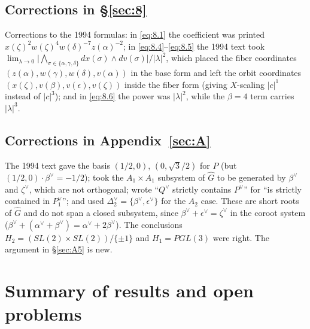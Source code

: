 \documentclass[12pt,letterpaper]{amsart}
\theoremstyle{plain}
\theoremstyle{definition}
\theoremstyle{remark}
\theoremstyle{definition}
\begin{document}
\subsection*{Corrections in \S\ref{sec:8}}

\begin{rem26}\label{rem:8.forms}
Corrections to the 1994 formulas: in \eqref{eq:8.1} the coefficient was printed
$x(\zeta)^2w(\zeta)^4w(\delta)^{-7}z(\alpha)^{-2}$; in \eqref{eq:8.4}--\eqref{eq:8.5}
the 1994 text took $\lim_{\lambda\to0}\bigl|\bigwedge_{\sigma\in\{\alpha,\gamma,\delta\}}dx(\sigma)\wedge dv(\sigma)\bigr|/|\lambda|^2$,
which placed the fiber coordinates $(z(\alpha),w(\gamma),w(\delta),v(\alpha))$
in the base form and left the orbit coordinates $(x(\zeta),v(\beta),v(\epsilon),v(\zeta))$
inside the fiber form (giving $X$-scaling $|c|^1$ instead of $|c|^3$); and in
\eqref{eq:8.6} the power was $|\lambda|^2$, while the $\beta=4$ term carries
$|\lambda|^3$.
\end{rem26}

\subsection*{Corrections in Appendix~\ref{sec:A}}

\begin{rem26}\label{rem:A5}
The 1994 text gave the basis $(1/2,0)$, $(0,\sqrt3/2)$ for $P$ (but
$(1/2,0)\cdot\beta^\vee=-1/2$); took the $A_1\times A_1$ subsystem of
$\widehat G$ to be generated by $\beta^\vee$ and $\zeta^\vee$, which are not
orthogonal; wrote ``$Q^\vee$ strictly contains $P^\vee$'' for ``is strictly
contained in $P_1^\vee$''; and used $\Delta_2^\vee=\{\beta^\vee,\epsilon^\vee\}$
for the $A_2$ case. These are short roots of $\widehat G$ and do not span a
closed subsystem, since $\beta^\vee+\epsilon^\vee=\zeta^\vee$ in the coroot
system ($\beta^\vee+(\alpha^\vee+\beta^\vee)=\alpha^\vee+2\beta^\vee$). The
conclusions $H_2=(SL(2)\times SL(2))/\{\pm1\}$ and $H_1=PGL(3)$ were right.
The argument in \S\ref{sec:A5} is new.
\end{rem26}

\section*{Summary of results and open problems}\label{sec:summary}
\end{document}
